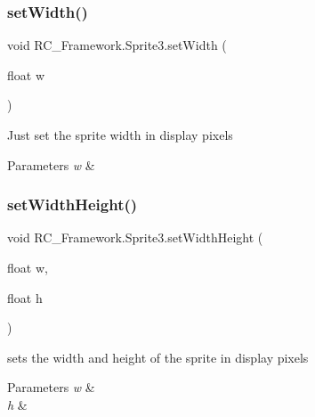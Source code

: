 \subsubsection{\texorpdfstring{set\+Width()}{setWidth()}}
{\footnotesize\ttfamily void R\+C\+\_\+\+Framework.\+Sprite3.\+set\+Width (\begin{DoxyParamCaption}\item[{float}]{w }\end{DoxyParamCaption})}



Just set the sprite width in display pixels 


\begin{DoxyParams}{Parameters}
{\em w} & \\
\hline
\end{DoxyParams}
\mbox{\label{class_r_c___framework_1_1_sprite3_ac7c6f7b2d84cfae1559eb4c84cb37f59}} 
\subsubsection{\texorpdfstring{set\+Width\+Height()}{setWidthHeight()}}
{\footnotesize\ttfamily void R\+C\+\_\+\+Framework.\+Sprite3.\+set\+Width\+Height (\begin{DoxyParamCaption}\item[{float}]{w,  }\item[{float}]{h }\end{DoxyParamCaption})}



sets the width and height of the sprite in display pixels 


\begin{DoxyParams}{Parameters}
{\em w} & \\
\hline
{\em h} & \\
\hline
\end{DoxyParams}
\mbox{\label{class_r_c___framework_1_1_sprite3_aced9c5f15e8334fd68852b3c9e67f2d8}} 
